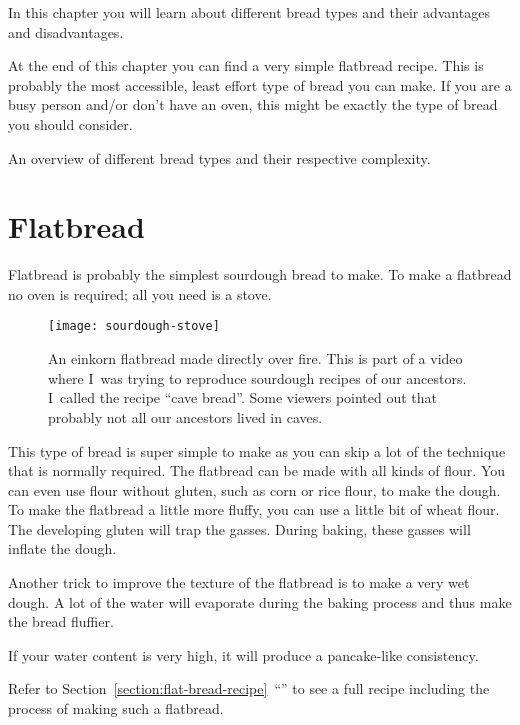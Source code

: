 In this chapter you will learn about different bread types
and their advantages and disadvantages.

At the end of this chapter
you can find a very simple flatbread recipe. This is probably
the most accessible, least effort type of bread you can make.
If you are a busy person and/or don't have an oven, this might
be exactly the type of bread you should consider.

\begin{table}[!htb]
    \begin{center}
        
        \caption{An overview of different bread types and their respective
        complexity.}%
        \label{tab:bread-types-comparison}
    \end{center}
\end{table}

\section{Flatbread}

Flatbread is probably the simplest sourdough bread to make.
To make a flatbread no oven is required; all you need is a stove.

\begin{figure}[!htb]
  \texttt{[image: sourdough-stove]}
  \caption{An einkorn flatbread made directly over fire. This
  is part of a video where I~was trying to reproduce sourdough
  recipes of our ancestors. I~called the recipe ``cave bread''. Some viewers
  pointed out that probably not all our ancestors lived in caves.}
\end{figure}

This type of bread is super simple to make as you can skip
a lot of the technique that is normally required. The flatbread
can be made with all kinds of flour. You can even use
flour without gluten, such as corn or rice flour, to make the
dough. To make the flatbread a little more fluffy, you
can use a little bit of wheat flour. The developing gluten
will trap the gasses. During baking, these gasses will
inflate the dough.

Another trick to improve the texture of the flatbread is to
make a very wet dough. A lot of the water will evaporate
during the baking process and thus make the bread fluffier.

If your water content is very high, it will produce a
pancake-like consistency.

Refer to Section~\ref{section:flat-bread-recipe}~``''
to see a full recipe including the process of making such a flatbread.

